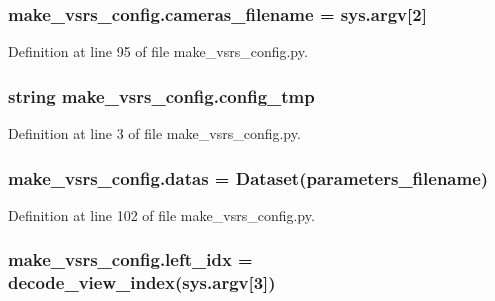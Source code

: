 \subsubsection[{\texorpdfstring{cameras\+\_\+filename}{cameras_filename}}]{\setlength{\rightskip}{0pt plus 5cm}make\+\_\+vsrs\+\_\+config.\+cameras\+\_\+filename = sys.\+argv\mbox{[}2\mbox{]}}\hypertarget{namespacemake__vsrs__config_ac3b756bb1e7859c774b381148fd53d68}{}\label{namespacemake__vsrs__config_ac3b756bb1e7859c774b381148fd53d68}


Definition at line 95 of file make\+\_\+vsrs\+\_\+config.\+py.

\subsubsection[{\texorpdfstring{config\+\_\+tmp}{config_tmp}}]{\setlength{\rightskip}{0pt plus 5cm}string make\+\_\+vsrs\+\_\+config.\+config\+\_\+tmp}\hypertarget{namespacemake__vsrs__config_a0688231eff3c27019463bd6ff56aacd9}{}\label{namespacemake__vsrs__config_a0688231eff3c27019463bd6ff56aacd9}


Definition at line 3 of file make\+\_\+vsrs\+\_\+config.\+py.

\subsubsection[{\texorpdfstring{datas}{datas}}]{\setlength{\rightskip}{0pt plus 5cm}make\+\_\+vsrs\+\_\+config.\+datas = {\bf Dataset}({\bf parameters\+\_\+filename})}\hypertarget{namespacemake__vsrs__config_aa31562adcb22457c1a02e578e04b07b7}{}\label{namespacemake__vsrs__config_aa31562adcb22457c1a02e578e04b07b7}


Definition at line 102 of file make\+\_\+vsrs\+\_\+config.\+py.

\subsubsection[{\texorpdfstring{left\+\_\+idx}{left_idx}}]{\setlength{\rightskip}{0pt plus 5cm}make\+\_\+vsrs\+\_\+config.\+left\+\_\+idx = decode\+\_\+view\+\_\+index(sys.\+argv\mbox{[}3\mbox{]})}\hypertarget{namespacemake__vsrs__config_aea06ffd15ffab67d1abe50d4e8c238a0}{}\label{namespacemake__vsrs__config_aea06ffd15ffab67d1abe50d4e8c238a0}


